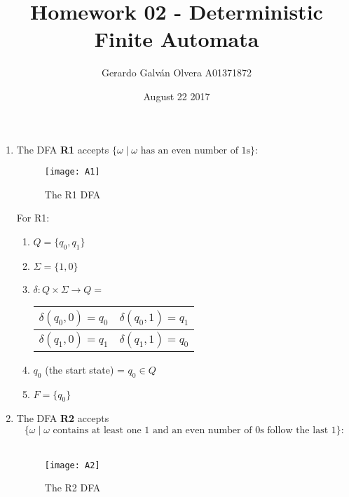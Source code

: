 \documentclass[11pt,a4paper]{article}
\title{Homework 02 - Deterministic Finite Automata}
\author{Gerardo Galván Olvera A01371872}
\date{August 22 2017}
\begin{document}
        \maketitle
                
        \begin{enumerate}
            \item The DFA \textbf{R1} accepts $\{\omega\mid\omega\text{ has an even number of 1s}\}$:\\
                \begin{figure}[H]
                    \centering
                    \texttt{[image: A1]}
                    \caption{The R1 DFA}
                \end{figure}

                For R1:
                \begin{enumerate}
                    \item $Q = \{q_0, q_1\}$
                    \item $\Sigma = \{1, 0\}$
                    \item $\delta \colon Q \times \Sigma \rightarrow Q =$
                        \begin{tabular}{|c|c|} 
                            \hline
                            $\delta(q_0, 0) = q_0$ & $\delta(q_0, 1) = q_1$\\
                            \hline
                            $\delta(q_1, 0) = q_1$ & $\delta(q_1, 1) = q_0$ \\
                            \hline
                       \end{tabular}

                    \item $q_0$ (the start state) = $q_0 \in Q$
                    \item $F = \{q_0\}$
                \end{enumerate}

            \item The DFA \textbf{R2} accepts \[ \{\omega\mid\omega\text{ contains at least one 1 and an even number of 0s follow the last 1}\}\colon\]\\
                \begin{figure}[H]
                    \centering
                    \texttt{[image: A2]}
                    \caption{The R2 DFA}
                \end{figure}


\end{enumerate}
\end{document}
